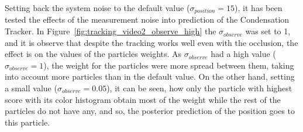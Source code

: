 \documentclass{ethz_report}
\begin{document}
Setting back the system noise to the default value ($\sigma_{position} = 15$), it has been tested the effects of the measurement noise into prediction of the Condensation Tracker.
In Figure~\ref{fig:tracking_video2_observe_high} the $\sigma_{observe}$ was set to 1, and it is observe that despite the tracking works well even with the occlusion, the effect is on the values of the particles weights.
As $\sigma_{observe}$ had a high value ($\sigma_{observe} = 1$), the weight for the particles were more spread between them, taking into account more particles than in the default value. On the other hand, setting a small value ($\sigma_{observe} = 0.05$), it can be seen, how only the particle with highest score with its color histogram obtain most of the weight while the rest of the particles do not have any, and so, the posterior prediction of the position goes to this particle.
\end{document}
